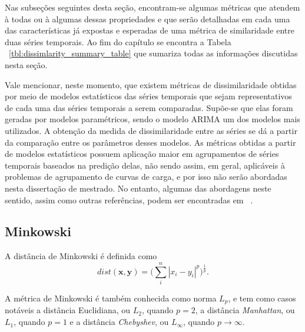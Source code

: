 Nas subseções seguintes desta seção, encontram-se algumas métricas que atendem à todas ou à algumas dessas propriedades e que serão detalhadas em cada uma das características já expostas e esperadas de uma métrica de similaridade entre duas séries temporais. Ao fim do capítulo se encontra a Tabela ~\ref{tbl:dissimlarity_summary_table} que sumariza todas  as informações discutidas nesta seção. 

Vale mencionar, neste momento, que existem métricas de dissimilaridade obtidas por meio de modelos estatísticos das séries temporais que sejam representativos de cada uma das séries temporais a serem comparadas. Supõe-se que elas foram geradas por modelos paramétricos, sendo o modelo ARIMA um dos modelos mais utilizados. A obtenção da medida de dissimilaridade entre as séries se dá a partir da comparação entre os parâmetros desses modelos. As métricas obtidas a partir de modelos estatísticos possuem aplicação maior em agrupamentos de séries temporais baseados na predição delas, não sendo assim, em geral, aplicáveis à problemas de agrupamento de curvas de carga, e por isso não serão abordadas nesta dissertação de mestrado. No entanto, algumas das abordagens neste sentido, assim como outras referências, podem ser encontradas em ~\parencite{TSCLUST}.

\subsection{Minkowski}

A distância de Minkowski é definida como
\begin{equation}
dist(\bm{x},\bm{y}) = \bigg (\sum_{i}^{n} |x_i -y_i|^p \bigg)^{\frac{1}{p}}.
\end{equation}

A métrica de Minkowski é também conhecida como norma $L_p$, e tem como casos notáveis a distância Euclidiana, ou $L_2$, quando $p=2$, a distância \emph{Manhattan}, ou $L_1$, quando $p=1$ e a distância \emph{Chebyshev}, ou $L_\infty$, quando $p\to\infty$.

